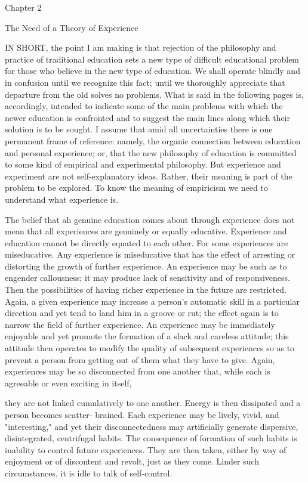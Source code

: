 Chapter 2 

The Need of a Theory of Experience 

IN SHORT, the point I am making is that rejection of the philosophy and practice of 
traditional education sets a new type of difficult educational problem for those who 
believe in the new type of education. We shall operate blindly and in confusion until we 
recognize this fact; until we thoroughly appreciate that departure from the old solves no 
problems. What is said in the following pages is, accordingly, intended to indicate some 
of the main problems with which the newer education is confronted and to suggest the 
main lines along which their solution is to be sought. I assume that amid all uncertainties 
there is one permanent frame of reference: namely, the organic connection between 
education and personal experience; or, that the new philosophy of education is committed 
to some kind of empirical and experimental philosophy. But experience and experiment 
are not self-explanatory ideas. Rather, their meaning is part of the problem to be 
explored. To know the meaning of empiricism we need to understand what experience is. 

The belief that ah genuine education comes about through experience does not mean 
that all experiences are genuinely or equally educative. Experience and education cannot 
be directly equated to each other. For some experiences are miseducative. Any 
experience is miseducative that has the effect of arresting or distorting the growth of 
further experience. An experience may be such as to engender callousness; it may 
produce lack of sensitivity and of responsiveness. Then the possibilities of having richer 
experience in the future are restricted. Again, a given experience may increase a person's 
automatic skill in a particular direction and yet tend to land him in a groove or rut; the 
effect again is to narrow the field of further experience. An experience may be 
immediately enjoyable and yet promote the formation of a slack and careless attitude; this 
attitude then operates to modify the quality of subsequent experiences so as to prevent a 
person from getting out of them what they have to give. Again, experiences may be so 
disconnected from one another that, while each is agreeable or even exciting in itself, 


they are not linked cumulatively to one another. Energy is then dissipated and a person 
becomes scatter- brained. Each experience may be lively, vivid, and "interesting," and yet 
their disconnectedness may artificially generate dispersive, disintegrated, centrifugal 
habits. The consequence of formation of such habits is inability to control future 
experiences. They are then taken, either by way of enjoyment or of discontent and revolt, 
just as they come. Linder such circumstances, it is idle to talk of self-control. 

